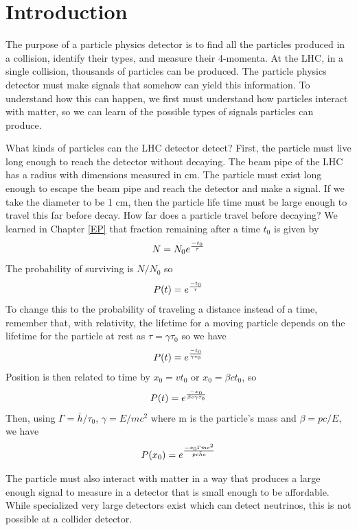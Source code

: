 
\section{Introduction}

The purpose of a particle physics detector is to find all the particles produced
in a collision, identify their types, and measure their 4-momenta.
At the LHC, in a single collision, thousands of particles can be produced.
The particle physics detector must make signals that somehow can yield this information.
To understand how this can happen, we first must understand how particles interact
with matter, so we can learn of the possible types of signals particles can produce.

What kinds of particles can the LHC detector detect?  First, the particle must live long 
enough to reach the detector without decaying.  The beam pipe of the LHC has a 
radius with dimensions measured in cm.  The particle must exist long enough to escape the beam pipe and
reach the detector and make a signal.  If we take the diameter to be 1 cm, then
the particle life time must be large enough to travel this far before decay.
How far does a particle travel before decaying?  We learned in Chapter \ref{EP} that fraction remaining after a time $t_0$ is given by
\begin{equation}
N=N_0 e^{-t_0 \over \tau}
\end{equation}
The probability of surviving is $N / N_0$ so
\begin{equation}
P(t)= e^{-t_0 \over \tau}
\end{equation}
To change this to the probability of traveling a distance instead of a time, remember that, with relativity, the lifetime for a moving particle depends on the lifetime for the particle at rest as $\tau = \gamma \tau_0$ so we have
 \begin{equation}
P(t)=e^{-t_0 \over {\gamma \tau_0}}
\end{equation}
Position is then related to time by $x_0=vt_0$ or $x_0=\beta c t_0$, so
\begin{equation}
P(t)=e^{-x_0 \over {\beta c \gamma \tau_0}}
\end{equation}
Then, using
$\Gamma=\bar{h}/\tau_0$, $\gamma=E/mc^2$ where m is the particle's mass 
and $\beta=pc/E$, we have
\begin{equation}
P(x_0)=e^{{-x_0\Gamma mc^2}\over{pc\bar{h}c}}
\end{equation}

The particle must also interact  with matter in a way that produces a large enough signal to measure in a detector that is small enough to be affordable.  While specialized very large detectors exist which can detect neutrinos, this is not possible at a collider detector.

